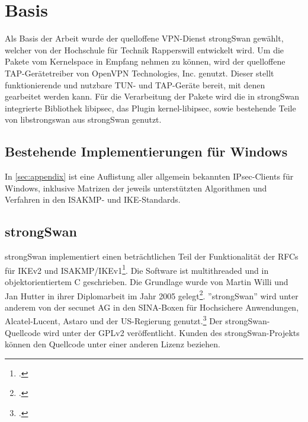 


\section{Basis}
Als Basis der Arbeit wurde der quelloffene VPN-Dienst strongSwan gewählt,
welcher von der Hochschule für Technik Rapperswill entwickelt wird.
Um die Pakete vom Kernelspace in Empfang nehmen zu können, wird der quelloffene
TAP-Gerätetreiber von OpenVPN Technologies, Inc. genutzt. Dieser stellt funktionierende
und nutzbare TUN- und TAP-Geräte bereit, mit denen gearbeitet werden kann.
Für die Verarbeitung der Pakete wird die in strongSwan integrierte Bibliothek libipsec,
das Plugin kernel-libipsec, sowie bestehende Teile von libstrongswan
aus strongSwan genutzt.

\subsection{Bestehende Implementierungen für Windows}

In \autoref{sec:appendix} ist eine Auflistung aller allgemein bekannten IPsec-Clients für Windows,
inklusive Matrizen der jeweils unterstützten Algorithmen und Verfahren in den ISAKMP-
und IKE-Standards.

\subsection{strongSwan}
\label{ch:strongswan}
strongSwan implementiert einen beträchtlichen Teil der Funktionalität der \acp{RFC} für IKEv2 und ISAKMP/IKEv1\footcite{_ipsecstandards_2016}.
Die Software ist multithreaded und in objektorientiertem C geschrieben.
Die Grundlage wurde von Martin Willi und Jan Hutter in ihrer Diplomarbeit im Jahr 2005 gelegt\footcite[][]{jan_hutter_strongswan_2005}.
''strongSwan'' wird unter anderem von der secunet AG in den SINA-Boxen für Hochsichere Anwendungen, Alcatel-Lucent, Astaro und
der US-Regierung genutzt.\footcite[][Folie 8]{andreas_steffen_strongswan_2011}
Der strongSwan-Quellcode wird unter der GPLv2 veröffentlicht. Kunden des strongSwan-Projekts können
den Quellcode unter einer anderen Lizenz beziehen.

